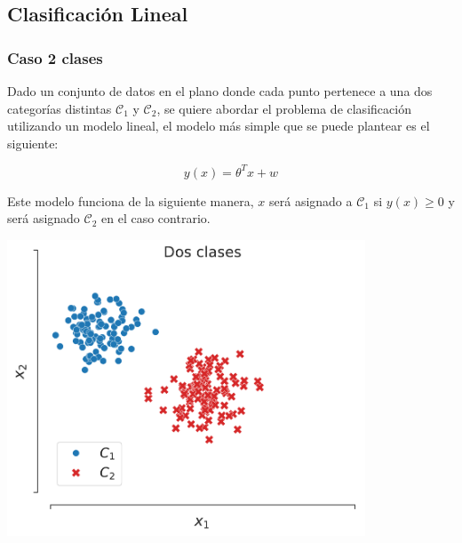 
\subsection{Clasificación Lineal}

\subsubsection{Caso 2 clases}

\begin{minipage}{0.4\textwidth}
	Dado un conjunto de datos en el plano donde cada punto pertenece a una dos categorías distintas $\mathcal{C}_1$ y $\mathcal{C}_2$, se quiere abordar el problema de clasificación utilizando un modelo lineal, el modelo más simple que se puede plantear es el siguiente:
	
	\begin{equation}
		y(x) = \theta^Tx + w
	\end{equation}
	
	Este modelo funciona de la siguiente manera, $x$ será asignado a $\mathcal{C}_1$ si $y(x) \geq 0$ y será asignado $\mathcal{C}_2$ en el caso contrario.
\end{minipage}\hfill
\begin{minipage}{0.5\textwidth}
	\centering
	\includegraphics[width=0.8\textwidth]{img/cap2_dosclases}\\
	\label{fig:puntos_2d}
\end{minipage}

